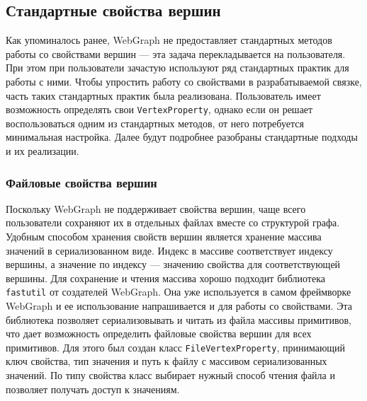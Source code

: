 \documentclass[times,specification,annotation]{itmo-student-thesis}
\begin{document}
\subsection{Стандартные свойства вершин}

Как упоминалось ранее, WebGraph не предоставляет стандартных методов работы со свойствами вершин --- эта задача перекладывается на пользователя. При этом при пользователи зачастую используют ряд стандартных практик для работы с ними. Чтобы упростить работу со свойствами в разрабатываемой связке, часть таких стандартных практик была реализована. Пользователь имеет возможность определять свои \texttt{VertexProperty}, однако если он решает воспользоваться одним из стандартных методов, от него потребуется минимальная настройка. Далее будут подробнее разобраны стандартные подходы и их реализации. 

\subsubsection{Файловые свойства вершин}

Поскольку WebGraph не поддерживает свойства вершин, чаще всего пользователи сохраняют их в отдельных файлах вместе со структурой графа. Удобным способом хранения свойств вершин является хранение массива значений в сериализованном виде. Индекс в массиве соответствует индексу вершины, а значение по индексу --- значению свойства для соответствующей вершины. Для сохранение и чтения массива хорошо подходит библиотека \texttt{fastutil} от создателей WebGraph. Она уже используется в самом фреймворке WebGraph и ее использование напрашивается и для работы со свойствами.
Эта библиотека позволяет сериализовывать и читать из файла массивы примитивов, что дает возможность определить файловые свойства вершин для всех примитивов. Для этого был создан класс \texttt{FileVertexProperty}, принимающий ключ свойства, тип значения и путь к файлу с массивом сериализованных значений. По типу свойства класс выбирает нужный способ чтения файла и позволяет получать доступ к значениям.
\end{document}
